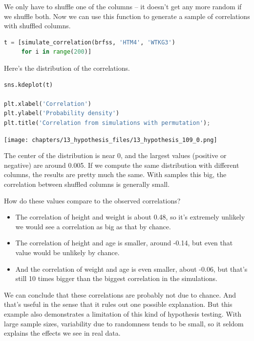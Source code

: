 We only have to shuffle one of the columns -- it doesn't get any more
random if we shuffle both. Now we can use this function to generate a
sample of correlations with shuffled columns.

\begin{lstlisting}[language=Python,style=source]
t = [simulate_correlation(brfss, 'HTM4', 'WTKG3')
     for i in range(200)]
\end{lstlisting}

Here's the distribution of the correlations.

\begin{lstlisting}[language=Python,style=source]
sns.kdeplot(t)

plt.xlabel('Correlation')
plt.ylabel('Probability density')
plt.title('Correlation from simulations with permutation');
\end{lstlisting}

\begin{center}
\texttt{[image: chapters/13\_hypothesis\_files/13\_hypothesis\_109\_0.png]}
\end{center}

The center of the distribution is near 0, and the largest values
(positive or negative) are around 0.005. If we compute the same
distribution with different columns, the results are pretty much the
same. With samples this big, the correlation between shuffled columns is
generally small.

How do these values compare to the observed correlations?

\begin{itemize}
\item
  The correlation of height and weight is about 0.48, so it's extremely
  unlikely we would see a correlation as big as that by chance.
\item
  The correlation of height and age is smaller, around -0.14, but even
  that value would be unlikely by chance.
\item
  And the correlation of weight and age is even smaller, about -0.06,
  but that's still 10 times bigger than the biggest correlation in the
  simulations.
\end{itemize}

We can conclude that these correlations are probably not due to chance.
And that's useful in the sense that it rules out one possible
explanation. But this example also demonstrates a limitation of this
kind of hypothesis testing. With large sample sizes, variability due to
randomness tends to be small, so it seldom explains the effects we see
in real data.

